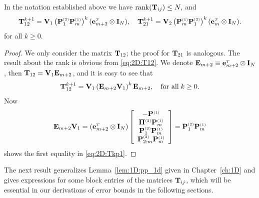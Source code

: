 \begin{lemma}\label{lem:2D:powers}
In the notation established above we have $\mathrm{rank}(\T_{ij})\leq N,$ and
%
\begin{equation}\label{eq:2D:Tkp1}
\T_{12}^{k+1} =  \V_1 \left( \PTwo_{1}\POne_{m} \right)^{k}
(\e_{m+2}^{\Tr}\otimes \I_N),
\quad
\T_{21}^{k+1} =  \V_2\left(\POne_{m}\PTwo_{1}\right)^{k}(\e_{m}^{\Tr}\otimes \I_N).
\end{equation}
for all $k\geq0$.
%
%
\end{lemma}
%
\begin{proof}
We only consider the matrix $\T_{12}$; the proof for $\T_{21}$ is analogous.
The result about the rank is obvious from \eqref{eq:2D:T12}. We denote
$\E_{m+2}\equiv \e_{m+2}^{\Tr}\otimes \I_N$, then $\T_{12}=\V_1\E_{m+2}$, and it
is easy to see that
%
$$\T_{12}^{k+1} =\V_1\left(\E_{m+2}\V_1\right)^{k}\E_{m+2},\quad \text{for all}\;k\geq0.$$
%
Now
%
\begin{equation*}
\E_{m+2}\V_1=(\e_{m+2}^{\Tr}\otimes \I_N)
\left[
\begin{array}{c}
  -\POne                         \\
   \PiTwo \POne_{m}              \\
   \PTwo_{1} \POne_{m}           \\
   \PTwo_{2:m} \POne_{m}
\end{array}
\right]=\PTwo_{1}\POne_{m}
\end{equation*}
%
shows the first equality in \eqref{eq:2D:Tkp1}.
\end{proof}

The next result generalizes Lemma~\ref{lem:1D:pp_1d} given in
Chapter~\ref{ch:1D} and gives expressions for some block entries of the
matrices $\T_{ij}$, which will be essential in our derivations of error bounds
in the following sections.

